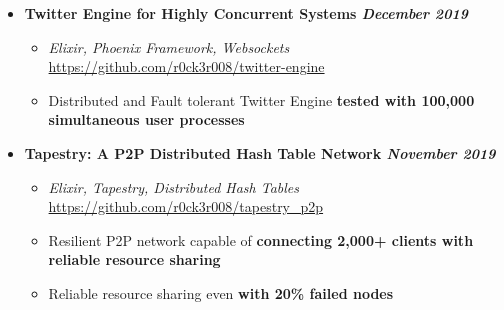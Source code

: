 \documentclass[9]{Resume}
\begin{document}
\begin{itemize}[noitemsep,nolistsep]
    \item[]\textbf{Twitter Engine for Highly Concurrent Systems \hfill \textit{December 2019}}
        \begin{itemize}[leftmargin=*]
            \setlength\itemsep{-0.25em}
            \item[\textbullet]\textit{Elixir, Phoenix Framework, Websockets} \hfill \href{https://github.com/r0ck3r008/twitter-engine}{{\scriptsize https://github.com/r0ck3r008/twitter-engine}}
            \item[\textbullet]Distributed and Fault tolerant Twitter Engine \textbf{tested with 100,000 simultaneous user processes}
        \end{itemize}

    \item[]\textbf{Tapestry: A P2P Distributed Hash Table Network \hfill \textit{November 2019}}
        \begin{itemize}[leftmargin=*]
            \setlength\itemsep{-0.25em}
            \item[\textbullet]\textit{Elixir, Tapestry, Distributed Hash Tables} \hfill \href{https://github.com/r0ck3r008/tapestry\_p2p}{{\scriptsize https://github.com/r0ck3r008/tapestry\_p2p}}
            \item[\textbullet]Resilient P2P network capable of \textbf{connecting 2,000+ clients with reliable resource sharing}
            \item[\textbullet]Reliable resource sharing even \textbf{with 20\% failed nodes}
        \end{itemize}

\end{itemize}
\end{document}
